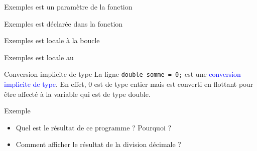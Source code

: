 \documentclass[10pt]{beamer}
\begin{document}
\begin{frame}[fragile]{\Ctitle}{\stitle}
	\begin{exampleblock}{Exemples}
		 est un paramètre de la fonction 
	\end{exampleblock}
\end{frame}

\begin{frame}[fragile]{\Ctitle}{\stitle}
	\begin{exampleblock}{Exemples}
		 est déclarée dans la fonction 
	\end{exampleblock}
\end{frame}

\begin{frame}[fragile]{\Ctitle}{\stitle}
	\begin{exampleblock}{Exemples}
		 est locale à la boucle
	\end{exampleblock}
\end{frame}

\begin{frame}[fragile]{\Ctitle}{\stitle}
	\begin{exampleblock}{Exemples}
		 est locale au 
	\end{exampleblock}
\end{frame}

\begin{frame}[fragile]{\Ctitle}{\stitle}

	\begin{block}{Conversion implicite de type}
		La ligne \texttt{double somme = 0;} est une \textcolor{blue}{conversion implicite de type}. En effet, 0 est de type entier mais est converti en flottant pour être affecté à la variable  qui est de type double.
	\end{block}
\end{frame}

\begin{frame}[fragile]{\Ctitle}{\stitle}
	\begin{exampleblock}{Exemple}
		\begin{itemize}
			\item<2-> Quel est le résultat de ce programme ? Pourquoi ?
			\item<3-> Comment afficher le résultat de la division décimale ?
		\end{itemize}
	\end{exampleblock}
\end{frame}
\end{document}
